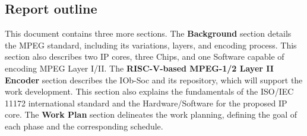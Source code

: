\subsection{Report outline}

This document contains three more sections. The \textbf{Background} section
details the MPEG standard, including its variations, layers, and encoding
process. This section also describes two IP cores, three Chips, and one Software
capable of encoding MPEG Layer I/II. The \textbf{RISC-V-based MPEG-1/2 Layer II
  Encoder} section describes the IOb-Soc and its repository, which will support
the work development. This section also explains the fundamentals of the ISO/IEC
11172 international standard and the Hardware/Software for the proposed IP
core. The \textbf{Work Plan} section delineates the work planning, defining the
goal of each phase and the corresponding schedule.

